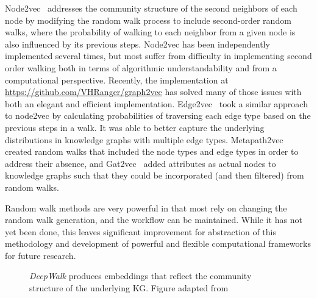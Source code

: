 Node2vec~\cite{Grover2016} addresses the community structure of the second neighbors of each node by modifying the random walk process to include second-order random walks, where the probability of walking to each neighbor from a given node is also influenced by its previous steps.
Node2vec has been independently implemented several times, but most suffer from difficulty in implementing second order walking both in terms of algorithmic understandability and from a computational perspective.
Recently, the implementation at \url{https://github.com/VHRanger/graph2vec} has solved many of those issues with both an elegant and efficient implementation.
Edge2vec~\cite{Gao2018} took a similar approach to node2vec by calculating probabilities of traversing each edge type based on the previous steps in a walk.
It was able to better capture the underlying distributions in knowledge graphs with multiple edge types.
Metapath2vec~\cite{Dong2017} created random walks that included the node types and edge types in order to address their absence, and Gat2vec~\cite{Sheikh2018} added attributes as actual nodes to knowledge graphs such that they could be incorporated (and then filtered) from random walks.

Random walk methods are very powerful in that most rely on changing the random walk generation, and the workflow can be maintained.
While it has not yet been done, this leaves significant improvement for abstraction of this methodology and development of powerful and flexible computational frameworks for future research.

\begin{figure}
    \captionsetup{format=plain}
    \caption[DeepWalk Embeddings Reflect Community Structure]{\textit{DeepWalk} produces embeddings that reflect the community structure of the underlying \ac{KG}. Figure adapted from~\cite{Perozzi2014}}
    \label{fig:deepwalk_embedding}
\end{figure}

